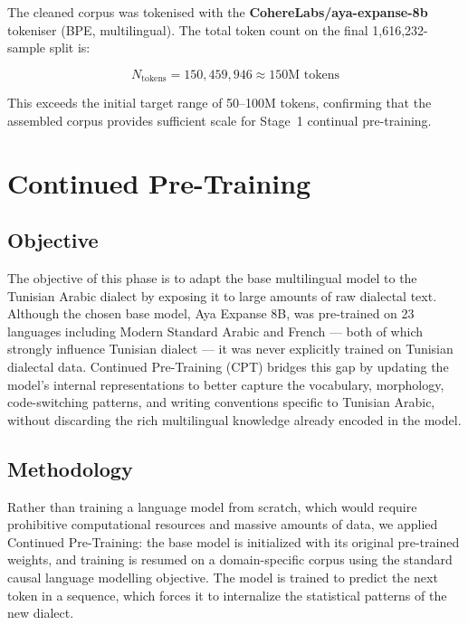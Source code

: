 \documentclass[12pt,a4paper]{report}
\begin{document}
The cleaned corpus was tokenised with the
\textbf{CohereLabs/aya-expanse-8b} tokeniser (BPE, multilingual).
The total token count on the final 1{,}616{,}232-sample split is:

\begin{equation}
    N_{\text{tokens}} = 150{,}459{,}946 \approx 150\text{M tokens}
\end{equation}

\noindent This exceeds the initial target range of 50--100M tokens, confirming
that the assembled corpus provides sufficient scale for Stage~1 continual
pre-training.
\section{Continued Pre-Training}

\subsection{Objective}

The objective of this phase is to adapt the base multilingual model to the
Tunisian Arabic dialect by exposing it to large amounts of raw dialectal text.
Although the chosen base model, Aya Expanse 8B, was pre-trained on 23
languages including Modern Standard Arabic and French --- both of which
strongly influence Tunisian dialect --- it was never explicitly trained on
Tunisian dialectal data. Continued Pre-Training (CPT) bridges this gap by
updating the model's internal representations to better capture the vocabulary,
morphology, code-switching patterns, and writing conventions specific to
Tunisian Arabic, without discarding the rich multilingual knowledge already
encoded in the model.

\subsection{Methodology}

Rather than training a language model from scratch, which would require
prohibitive computational resources and massive amounts of data, we applied
Continued Pre-Training: the base model is initialized with its original
pre-trained weights, and training is resumed on a domain-specific corpus using
the standard causal language modelling objective. The model is trained to
predict the next token in a sequence, which forces it to internalize the
statistical patterns of the new dialect.
\end{document}
